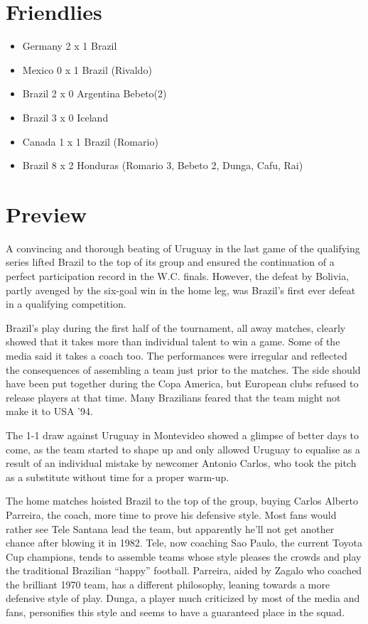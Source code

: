 \section{Friendlies}
\begin{itemize}
\item Germany 2 x 1   Brazil
\item Mexico  0 x 1   Brazil     (Rivaldo)
\item Brazil  2 x 0   Argentina  Bebeto(2)
\item Brazil  3 x 0   Iceland
\item Canada  1 x 1   Brazil       (Rom{\’a}rio)
\item Brazil  8 x 2   Honduras  (Rom{\’a}rio 3, Bebeto 2, Dunga, Cafu, Rai)
\end{itemize}
\section{Preview}
A convincing and thorough beating of Uruguay in the last game of the qualifying
series lifted Brazil to the top of its group and ensured the continuation of a 
perfect participation record in the W.C. finals. However, the defeat by Bolivia, 
partly avenged by the six-goal win in the home leg, was Brazil's first ever 
defeat in a qualifying competition.

Brazil's play during the first half of the tournament, all away matches, 
clearly showed that it takes more than individual talent to win a game. Some of 
the media said it takes a coach too.  The performances were irregular and 
reflected the consequences of assembling a team just prior to the matches. The 
side should have been put together during the Copa America, but European clubs 
refused to release players at that time. Many Brazilians feared that the team
might not make it to USA '94.

The 1-1 draw against Uruguay in Montevideo showed a glimpse of better days to 
come, as the team started to shape up and only allowed Uruguay to equalise as a
result of an individual mistake by newcomer Antonio Carlos, who took the pitch
as a substitute without time for a proper warm-up.

The home matches hoisted Brazil to the top of the group, buying Carlos Alberto 
Parreira, the coach, more time to prove his defensive style. Most fans would 
rather see Tele Santana lead the team, but apparently he'll not get another 
chance after blowing it in 1982. Tele, now coaching Sao Paulo, the current 
Toyota Cup champions, tends to assemble teams whose style pleases the crowds 
and play the traditional Brazilian ``happy'' football. Parreira, aided by 
Zagalo who coached the brilliant 1970 team, has a different philosophy, leaning 
towards a more defensive style of play. Dunga, a player much criticized by most 
of the media and fans, personifies this style and seems to have a guaranteed 
place in the squad.


